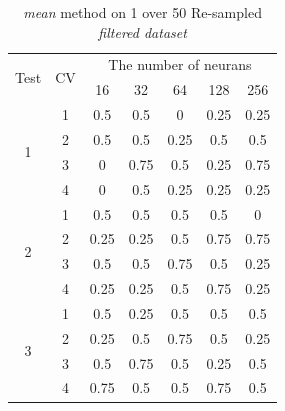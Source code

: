 \documentclass[draft,dvipsnames]{drexel-thesis}
\begin{document}
\begin{thesis}
\begin{table}[!t]
\centering
\caption{{\em mean} method on 1 over 50 Re-sampled {\em filtered dataset}}
\label{tbl:mean_1_50}
\begin{tabular}{|c|c|c|c|c|c|c|}
\hline
\multirow{2}{*}{Test} & \multirow{2}{*}{CV} & \multicolumn{5}{c|}{The number of neurans}                             \\ \cline{3-7} 
                      &                     & 16          & 32           & 64          & 128          & 256          \\ \hline
\multirow{4}{*}{1}    & 1                   & 0.5         & 0.5          & 0           & 0.25         & 0.25         \\ \cline{2-7} 
                      & 2                   & 0.5         & 0.5          & 0.25        & 0.5          & 0.5          \\ \cline{2-7} 
                      & 3                   & 0           & 0.75         & 0.5         & 0.25         & 0.75         \\ \cline{2-7} 
                      & 4                   & 0           & 0.5          & 0.25        & 0.25         & 0.25         \\ \hline
\multirow{4}{*}{2}    & 1                   & 0.5         & 0.5          & 0.5         & 0.5          & 0            \\ \cline{2-7} 
                      & 2                   & 0.25        & 0.25         & 0.5         & 0.75         & 0.75         \\ \cline{2-7} 
                      & 3                   & 0.5         & 0.5          & 0.75        & 0.5          & 0.25         \\ \cline{2-7} 
                      & 4                   & 0.25        & 0.25         & 0.5         & 0.75         & 0.25         \\ \hline
\multirow{4}{*}{3}    & 1                   & 0.5         & 0.25         & 0.5         & 0.5          & 0.5          \\ \cline{2-7} 
                      & 2                   & 0.25        & 0.5          & 0.75        & 0.5          & 0.25         \\ \cline{2-7} 
                      & 3                   & 0.5         & 0.75         & 0.5         & 0.25         & 0.5          \\ \cline{2-7} 
                      & 4                   & 0.75        & 0.5          & 0.5         & 0.75         & 0.5          \\ \hline

\end{tabular}
\end{table}
\end{thesis}
\end{document}
